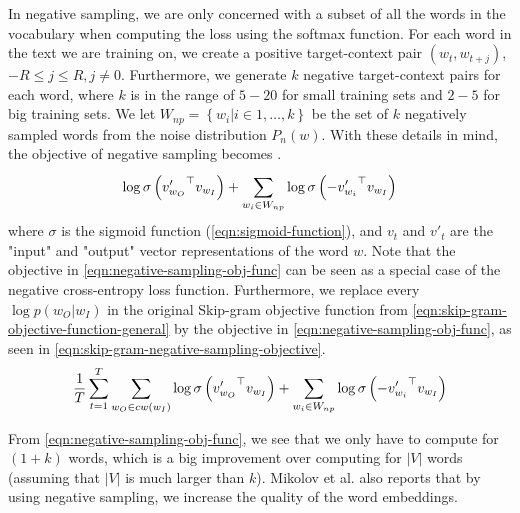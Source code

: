 In negative sampling, we are only concerned with a subset of all the words in the vocabulary when computing the loss using the softmax function. For each word in the text we are training on, we create a positive target-context pair $\left( w_t, w_{t+j} \right)$, $-R \leq j \leq R, j \neq 0$. Furthermore, we generate $k$ negative target-context pairs for each word, where $k$ is in the range of $5-20$ for small training sets and $2-5$ for big training sets. We let $W_{np} = \left \{ w_i | i \in 1, \ldots, k \right \}$ be the set of $k$ negatively sampled words from the noise distribution $P_n(w)$. With these details in mind, the objective of negative sampling becomes \cite{mikolov2013b, rong2016word2vec}.
\begin{align}
    \log \sigma \left( {v'_{w_O}}^\top v_{w_I} \right) + \sum\limits_{w_i \in W_{np}}^{} \log \sigma \left( -{v'_{w_i}}^\top v_{w_I} \right)
    \label{eqn:negative-sampling-obj-func}
\end{align}
where $\sigma$ is the sigmoid function (\cref{eqn:sigmoid-function}), and $v_t$ and $v'_t$ are the "input" and "output" vector representations of the word $w$. Note that the objective in \cref{eqn:negative-sampling-obj-func} can be seen as a special case of the negative cross-entropy loss function. Furthermore, we replace every $\log p(w_O | w_I)$ in the original Skip-gram objective function from \cref{eqn:skip-gram-objective-function-general} by the objective in \cref{eqn:negative-sampling-obj-func}, as seen in \cref{eqn:skip-gram-negative-sampling-objective}.
\begin{align}
    \frac{1}{T} \sum\limits_{t=1}^{T} \sum\limits_{w_O \in cw(w_I)}^{} \log \sigma \left( {v'_{w_O}}^\top v_{w_I} \right) + \sum\limits_{w_i \in W_{np}}^{} \log \sigma \left( -{v'_{w_i}}^\top v_{w_I} \right)
    \label{eqn:skip-gram-negative-sampling-objective}
\end{align}

From \cref{eqn:negative-sampling-obj-func}, we see that we only have to compute for $(1 + k)$ words, which is a big improvement over computing for $|V|$ words (assuming that $|V|$ is much larger than $k$). Mikolov et al. also reports that by using negative sampling, we increase the quality of the word embeddings.

